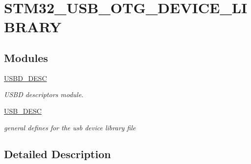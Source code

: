 \hypertarget{group__STM32__USB__OTG__DEVICE__LIBRARY}{}\section{S\+T\+M32\+\_\+\+U\+S\+B\+\_\+\+O\+T\+G\+\_\+\+D\+E\+V\+I\+C\+E\+\_\+\+L\+I\+B\+R\+A\+RY}
\label{group__STM32__USB__OTG__DEVICE__LIBRARY}
\subsection*{Modules}
\begin{DoxyCompactItemize}
\item 
\hyperlink{group__USBD__DESC}{U\+S\+B\+D\+\_\+\+D\+E\+SC}
\begin{DoxyCompactList}\small\item\em U\+S\+BD descriptors module. \end{DoxyCompactList}\item 
\hyperlink{group__USB__DESC}{U\+S\+B\+\_\+\+D\+E\+SC}
\begin{DoxyCompactList}\small\item\em general defines for the usb device library file \end{DoxyCompactList}\end{DoxyCompactItemize}


\subsection{Detailed Description}
